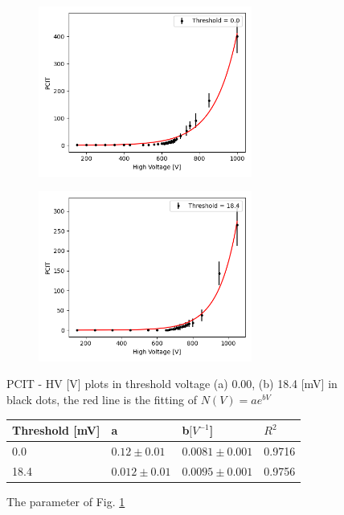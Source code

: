 \documentclass{article}
\begin{document}
 \begin{figure}[H]
  \centering
  \begin{subfigure}[b]{7cm}
      \centering
      \includegraphics[width=7cm]{../results/PMT_upper_boundary_(0.0).png}
      \caption{}
  \end{subfigure}
  \hfill
  \begin{subfigure}[b]{7cm}
    \centering
    \includegraphics[width=7cm]{../results/PMT_upper_boundary_(18.4).png}
    \caption{}
\end{subfigure}
\hfill
  \caption{PCIT - HV [V] plots in threshold voltage (a) 0.00, (b) 18.4 [mV] in black dots,
    the red line is the fitting of $N(V) = a e^{bV}$
  }
  \label{fig: PMT_upper_boundary}
\end{figure}
\begin{figure}[H]
  \centering
  \begin{tabular}{  m{4cm}|m{2.5cm}|m{2.5cm}|m{2.5cm}} 
    Threshold [mV]& a& b$[V^{-1}$]& $R^2$ \\ \hline \hline
    0.0& $0.12 \pm 0.01$& $0.0081 \pm 0.001$& 0.9716\\ \hline 
    18.4& $0.012 \pm 0.01$& $0.0095 \pm 0.001$& 0.9756\\
  \end{tabular}
  \caption{The parameter of Fig. \ref{fig: PMT_upper_boundary}}
  \label{fig: PMT_upper_boundary_statics}
\end{figure}
\end{document}
